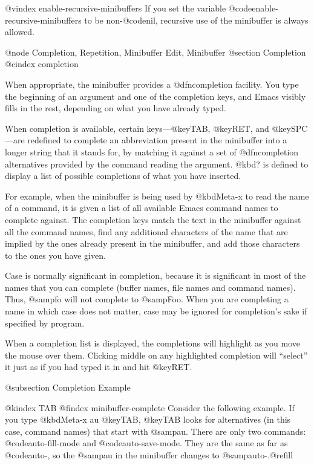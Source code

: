 {{@vindex enable-recursive-minibuffers
  If you set the variable @code{enable-recursive-minibuffers} to be
non-@code{nil}, recursive use of the minibuffer is always allowed.

@node Completion, Repetition, Minibuffer Edit, Minibuffer
@section Completion
@cindex completion

  When appropriate, the minibuffer provides a @dfn{completion} facility.
You type the beginning of an argument and one of the completion keys,
and Emacs visibly fills in the rest, depending on what you have already
typed.

  When completion is available, certain keys---@key{TAB}, @key{RET}, and
@key{SPC}---are redefined to complete an abbreviation present in the
minibuffer into a longer string that it stands for, by matching it
against a set of @dfn{completion alternatives} provided by the command
reading the argument.  @kbd{?} is defined to display a list of possible
completions of what you have inserted.

  For example, when the minibuffer is being used by @kbd{Meta-x} to read
the name of a command, it is given a list of all available Emacs command
names to complete against.  The completion keys match the text in the
minibuffer against all the command names, find any additional characters of
the name that are implied by the ones already present in the minibuffer,
and add those characters to the ones you have given.

  Case is normally significant in completion, because it is significant in
most of the names that you can complete (buffer names, file names and
command names).  Thus, @samp{fo} will not complete to @samp{Foo}.  When you
are completing a name in which case does not matter, case may be ignored
for completion's sake if specified by program.

When a completion list is displayed, the completions will highlight as
you move the mouse over them.  Clicking middle on any highlighted completion
will ``select'' it just as if you had typed it in and hit @key{RET}.

@subsection Completion Example

@kindex TAB
@findex minibuffer-complete
  Consider the following example.  If you type @kbd{Meta-x au @key{TAB}},
@key{TAB} looks for alternatives (in this case, command names) that
start with @samp{au}.  There are only two commands: @code{auto-fill-mode} and
@code{auto-save-mode}.  They are the same as far as @code{auto-}, so the
@samp{au} in the minibuffer changes to @samp{auto-}.@refill

}}

